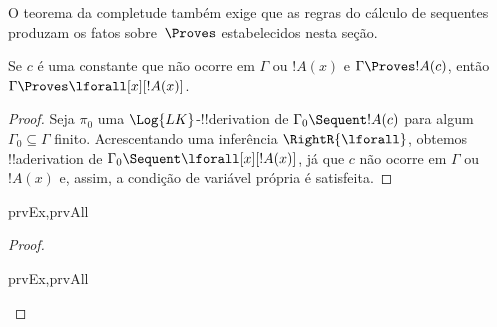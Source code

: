 \documentclass[../../../include/open-logic-section]{subfiles}
\begin{document}

\begin{explain}
  O teorema da completude também exige que as regras do cálculo de
  sequentes produzam os fatos sobre~$\Proves$ estabelecidos nesta
  seção.
\end{explain}

\begin{thm}
 Se $c$ é uma constante que não ocorre
em $\Gamma$ ou $!A(x)$ e $\Gamma \Proves !A(c)$, então $\Gamma
\Proves \lforall[x][!A(x)]$.
\end{thm}

\begin{proof}
Seja $\pi_0$ uma $\Log{LK}$-!!{derivation} de $\Gamma_0 \Sequent !A(c)$
para algum $\Gamma_0 \subseteq \Gamma$ finito.  Acrescentando uma
inferência $\RightR{\lforall}$, obtemos !!a{derivation} de $\Gamma_0 \Sequent
\lforall[x][!A(x)]$, já que $c$ não ocorre em $\Gamma$ ou $!A(x)$
e, assim, a condição de variável própria é satisfeita.
\end{proof}

\begin{prop}
\begin{tagenumerate}{prvEx,prvAll}
\end{tagenumerate}
\end{prop}

\begin{proof}
\begin{tagenumerate}{prvEx,prvAll}
\end{tagenumerate}
\end{proof}
\end{document}
